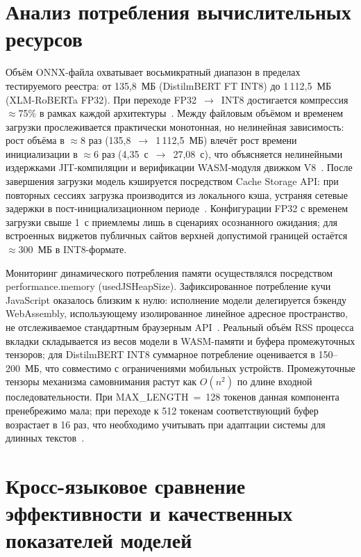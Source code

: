 \section{Анализ потребления вычислительных ресурсов}
\label{sec:анализ_потребления_вычислительных_ресурсов}

Объём ONNX-файла охватывает восьмикратный диапазон в пределах тестируемого реестра: от 135{,}8~МБ (DistilmBERT FT INT8) до 1\,112{,}5~МБ (XLM-RoBERTa FP32). При переходе FP32~$\rightarrow$~INT8 достигается компрессия $\approx$75\% в рамках каждой архитектуры~\cite{gholami2021quantization}. Между файловым объёмом и временем загрузки прослеживается практически монотонная, но нелинейная зависимость: рост объёма в $\approx$8 раз (135{,}8~$\rightarrow$~1\,112{,}5~МБ) влечёт рост времени инициализации в $\approx$6 раз (4{,}35~с~$\rightarrow$~27{,}08~с), что объясняется нелинейными издержками JIT-компиляции и верификации WASM-модуля движком V8~\cite{jia2024empowering}. После завершения загрузки модель кэшируется посредством Cache Storage API: при повторных сессиях загрузка производится из локального кэша, устраняя сетевые задержки в пост-инициализационном периоде~\cite{webdev2021coop}. Конфигурации FP32 с временем загрузки свыше 1~с приемлемы лишь в сценариях осознанного ожидания; для встроенных виджетов публичных сайтов верхней допустимой границей остаётся $\approx$300~МБ в INT8-формате.

Мониторинг динамического потребления памяти осуществлялся посредством performance.memory (usedJSHeapSize). Зафиксированное потребление кучи JavaScript оказалось близким к нулю: исполнение модели делегируется бэкенду WebAssembly, использующему изолированное линейное адресное пространство, не отслеживаемое стандартным браузерным API~\cite{zhang2024wasm}. Реальный объём RSS процесса вкладки складывается из весов модели в WASM-памяти и буфера промежуточных тензоров; для DistilmBERT INT8 суммарное потребление оценивается в 150–200~МБ, что совместимо с ограничениями мобильных устройств. Промежуточные тензоры механизма самовнимания растут как $O(n^2)$ по длине входной последовательности. При MAX\_LENGTH~=~128 токенов данная компонента пренебрежимо мала; при переходе к 512 токенам соответствующий буфер возрастает в 16 раз, что необходимо учитывать при адаптации системы для длинных текстов~\cite{wang2024anatomizing}.

\section{Кросс-языковое сравнение эффективности и качественных показателей моделей}
\label{sec:кросс_языковое_сравнение_эффективности_и_качественных_показателей_моделей}

